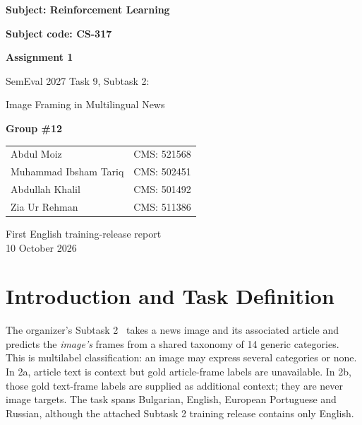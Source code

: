 \documentclass[11pt]{article}
\begin{document}
\begin{titlepage}
\centering
\vspace*{1.1in}
{\Large\bfseries Subject: Reinforcement Learning\par}
\vspace{0.12in}
{\large\bfseries Subject code: CS-317\par}
\vspace{0.65in}
{\Huge\bfseries Assignment 1\par}
\vspace{0.22in}
{\Large SemEval 2027 Task 9, Subtask 2:\par}
{\Large Image Framing in Multilingual News\par}
\vspace{0.65in}
{\Large\bfseries Group \#12\par}
\vspace{0.28in}
\begin{tabular}{ll}
Abdul Moiz & CMS: 521568\\
Muhammad Ibsham Tariq & CMS: 502451\\
Abdullah Khalil & CMS: 501492\\
Zia Ur Rehman & CMS: 511386
\end{tabular}
\vfill
{\large First English training-release report\\10 October 2026\par}
\end{titlepage}

\begin{abstract}
This report looks at SemEval 2027 Task 9, Subtask 2, where a system assigns zero or more frame labels to a news image. The first supplied training chunk has 400 English image--article pairs. We checked every image-to-article join and examined the labels and file quality before training. We then compared a small set of handcrafted image features with frozen ResNet-18 features, both with and without article text. On a shared 280/60/60 fit/calibration/evaluation split, local micro-F1 was 0.272 and 0.283 for the classical models and 0.309 and 0.308 for the frozen models. These are internal results, not organizer scores. The supplied Subtask 1 articles do not give us gold text-frame labels for the 400 Subtask 2 articles, so we could not run a valid 2b experiment on this chunk. The official scorer and later data releases still need to be checked.
\end{abstract}

\section{Introduction and Task Definition}\label{sec:task}
The organizer's Subtask 2~\cite{semeval2027task9} takes a news image and its associated article and predicts the \emph{image's} frames from a shared taxonomy of 14 generic categories. This is multilabel classification: an image may express several categories or none. In 2a, article text is context but gold article-frame labels are unavailable. In 2b, those gold text-frame labels are supplied as additional context; they are never image targets. The task spans Bulgarian, English, European Portuguese and Russian, although the attached Subtask 2 training release contains only English.
\end{document}
